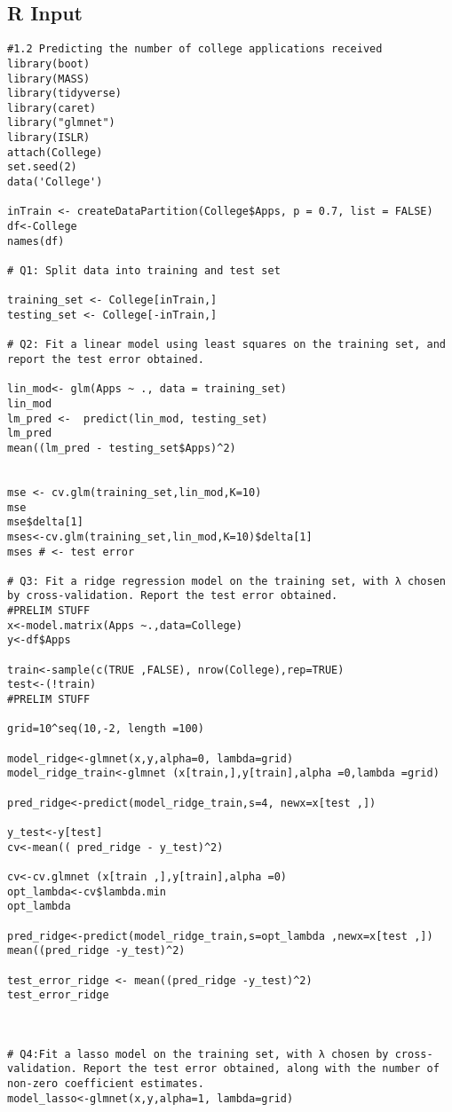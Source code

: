 \documentclass{article}
\begin{document}
\subsection{R Input}
\begin{verbatim}
#1.2 Predicting the number of college applications received
library(boot)
library(MASS)
library(tidyverse)
library(caret)
library("glmnet")
library(ISLR)
attach(College)
set.seed(2)
data('College')

inTrain <- createDataPartition(College$Apps, p = 0.7, list = FALSE)
df<-College
names(df)

# Q1: Split data into training and test set

training_set <- College[inTrain,]
testing_set <- College[-inTrain,]

# Q2: Fit a linear model using least squares on the training set, and report the test error obtained.

lin_mod<- glm(Apps ~ ., data = training_set)
lin_mod
lm_pred <-  predict(lin_mod, testing_set)
lm_pred
mean((lm_pred - testing_set$Apps)^2)


mse <- cv.glm(training_set,lin_mod,K=10)
mse
mse$delta[1]
mses<-cv.glm(training_set,lin_mod,K=10)$delta[1]
mses # <- test error

# Q3: Fit a ridge regression model on the training set, with λ chosen by cross-validation. Report the test error obtained.
#PRELIM STUFF
x<-model.matrix(Apps ~.,data=College)
y<-df$Apps

train<-sample(c(TRUE ,FALSE), nrow(College),rep=TRUE)
test<-(!train)
#PRELIM STUFF

grid=10^seq(10,-2, length =100)

model_ridge<-glmnet(x,y,alpha=0, lambda=grid)
model_ridge_train<-glmnet (x[train,],y[train],alpha =0,lambda =grid)

pred_ridge<-predict(model_ridge_train,s=4, newx=x[test ,])

y_test<-y[test]
cv<-mean(( pred_ridge - y_test)^2)

cv<-cv.glmnet (x[train ,],y[train],alpha =0)
opt_lambda<-cv$lambda.min
opt_lambda

pred_ridge<-predict(model_ridge_train,s=opt_lambda ,newx=x[test ,])
mean((pred_ridge -y_test)^2)

test_error_ridge <- mean((pred_ridge -y_test)^2)
test_error_ridge



# Q4:Fit a lasso model on the training set, with λ chosen by cross-validation. Report the test error obtained, along with the number of non-zero coefficient estimates.
model_lasso<-glmnet(x,y,alpha=1, lambda=grid)


\end{verbatim}
\end{document}
